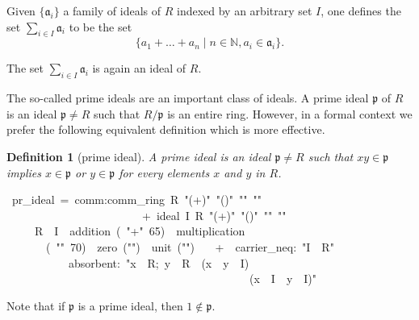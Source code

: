 \documentclass[12pt]{scrartcl}
\newtheorem{definition}[proposition]{Definition}
\begin{document}
Given $\lbrace \mathfrak{a}_i \rbrace$ a family of ideals of $R$ indexed by an arbitrary set $I$, one defines the set $\displaystyle \sum_{i \in I} \mathfrak{a}_i$ to be the set 
	\[
	\lbrace a_1 + \dots + a_n \mid n \in \mathbb{N}, a_i \in \mathfrak{a}_i \rbrace .
	\]

The set $\displaystyle \sum_{i \in I} \mathfrak{a}_i$ is again an ideal of $R$.	

The so-called prime ideals are an important class of ideals. A prime ideal $\mathfrak{p}$ of $R$ is an ideal $\mathfrak{p} \neq R$ such that $R/\mathfrak{p}$ is an entire ring. However, in a formal context we prefer the following equivalent definition which is more effective.

\begin{definition}[prime ideal]
	A prime ideal is an ideal $\mathfrak{p} \neq R$ such that $x y \in \mathfrak{p}$ implies $x \in \mathfrak{p}$ or $y \in \mathfrak{p}$ for every elements $x$ and $y$ in $R$.
\end{definition}

\begin{isabelle}
\ pr\_ideal\ =\ comm:comm\_ring\ R\ "(+)"\ "(\isasymcdot )"\ "\isasymzero "\ "\isasymone "\ \isanewline
\ \ \ \ \ \ \ \ \ \ \ \ \ \ \ \ \ \ \ \ \ \ \ \ +\ ideal\ I\ R\ "(+)"\ "(\isasymcdot )"\ "\isasymzero "\ "\isasymone "\isanewline
\ \ \ \ \ R\ \ I\ \ addition\ (\ "+"\ 65)\ \ multiplication\ \isanewline
\ \ \ \ \ \ \ (\ "\isasymcdot "\ 70)\ \ zero\ ("\isasymzero ")\ \ unit\ ("\isasymone ")\isanewline
\ \ \ +\ \ carrier\_neq:\ "I\ \isasymnoteq \ R"\ \isanewline
\ \ \ \ \ \ \ \ \ \ \ absorbent:\ "\isasymlbrakk x\ \isasymin \ R;\ y\ \isasymin \ R\isasymrbrakk \ \isasymLongrightarrow \ (x\ \isasymcdot \ y\ \isasymin \ I)\ \isanewline
\ \ \ \ \ \ \ \ \ \ \ \ \ \ \ \ \ \ \ \ \ \ \ \ \ \ \ \ \ \ \ \ \ \ \ \ \ \ \ \ \ \ \isasymLongrightarrow \ (x\ \isasymin \ I\ \isasymor \ y\ \isasymin \ I)"
\end{isabelle}

Note that if $\mathfrak{p}$ is a prime ideal, then $1 \notin \mathfrak{p}$.

\end{document}

